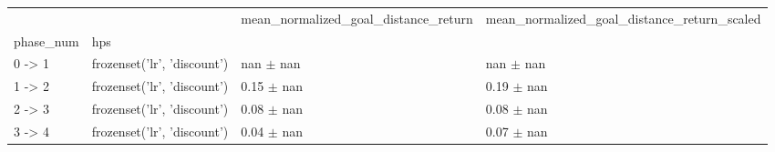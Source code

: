 \begin{tabular}{llll}
\toprule
 &  & mean_normalized_goal_distance_return & mean_normalized_goal_distance_return_scaled \\
phase_num & hps &  &  \\
\midrule
0 -> 1 & frozenset({'lr', 'discount'}) & nan $\pm$ nan & nan $\pm$ nan \\
\cline{1-4}
1 -> 2 & frozenset({'lr', 'discount'}) & 0.15 $\pm$ nan & 0.19 $\pm$ nan \\
\cline{1-4}
2 -> 3 & frozenset({'lr', 'discount'}) & 0.08 $\pm$ nan & 0.08 $\pm$ nan \\
\cline{1-4}
3 -> 4 & frozenset({'lr', 'discount'}) & 0.04 $\pm$ nan & 0.07 $\pm$ nan \\
\cline{1-4}
\bottomrule
\end{tabular}
